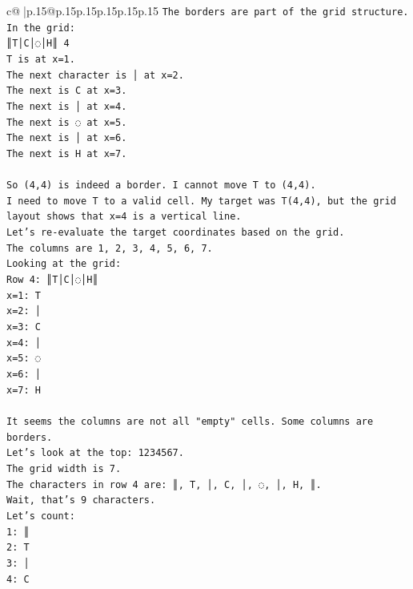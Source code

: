 \documentclass{article}
\begin{document}
{\begin{supertabular}{c@{$\;$}|p{.15\linewidth}@{}p{.15\linewidth}p{.15\linewidth}p{.15\linewidth}p{.15\linewidth}p{.15\linewidth}}
{{{\texttt{The borders are part of the grid structure.} \\
\texttt{In the grid:} \\
\texttt{║T│C│◌│H║ 4} \\
\texttt{T is at x=1.} \\
\texttt{The next character is │ at x=2.} \\
\texttt{The next is C at x=3.} \\
\texttt{The next is │ at x=4.} \\
\texttt{The next is ◌ at x=5.} \\
\texttt{The next is │ at x=6.} \\
\texttt{The next is H at x=7.} \\
\\ 
\texttt{So (4,4) is indeed a border. I cannot move T to (4,4).} \\
\texttt{I need to move T to a valid cell. My target was T(4,4), but the grid layout shows that x=4 is a vertical line.} \\
\texttt{Let's re{-}evaluate the target coordinates based on the grid.} \\
\texttt{The columns are 1, 2, 3, 4, 5, 6, 7.} \\
\texttt{Looking at the grid:} \\
\texttt{Row 4: ║T│C│◌│H║} \\
\texttt{x=1: T} \\
\texttt{x=2: │} \\
\texttt{x=3: C} \\
\texttt{x=4: │} \\
\texttt{x=5: ◌} \\
\texttt{x=6: │} \\
\texttt{x=7: H} \\
\\ 
\texttt{It seems the columns are not all "empty" cells. Some columns are borders.} \\
\texttt{Let's look at the top:  1234567.} \\
\texttt{The grid width is 7.} \\
\texttt{The characters in row 4 are: ║, T, │, C, │, ◌, │, H, ║.} \\
\texttt{Wait, that's 9 characters.} \\
\texttt{Let's count:} \\
\texttt{1: ║} \\
\texttt{2: T} \\
\texttt{3: │} \\
\texttt{4: C} \\
}}}
\end{supertabular}}
\end{document}
